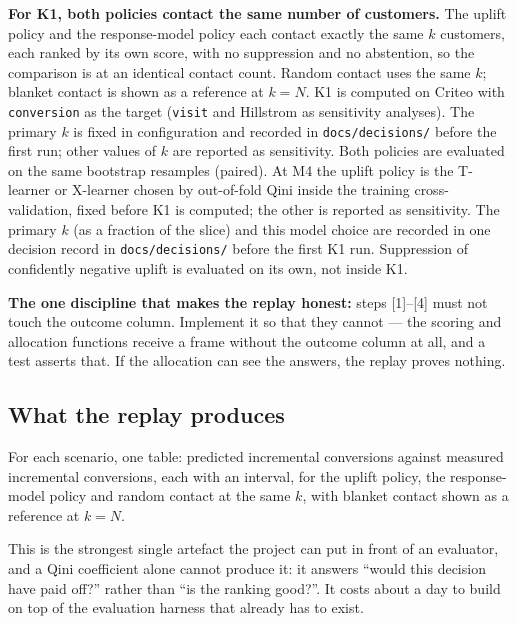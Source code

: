 \documentclass[11pt,a4paper]{article}
\begin{document}
\textbf{For K1, both policies contact the same number of customers.} The uplift policy and the
response-model policy each contact exactly the same $k$ customers, each ranked by its own score,
with no suppression and no abstention, so the comparison is at an identical contact count. Random
contact uses the same $k$; blanket contact is shown as a reference at $k = N$. K1 is computed on Criteo with \texttt{conversion} as the target (\texttt{visit} and Hillstrom as sensitivity analyses). The primary $k$ is fixed in configuration and recorded in \texttt{docs/decisions/} before the first run; other values of $k$ are reported as sensitivity. Both policies are evaluated on the same bootstrap resamples (paired). At M4 the uplift policy is the T-learner or X-learner chosen by out-of-fold Qini inside the training cross-validation, fixed before K1 is computed; the other is reported as sensitivity. The primary $k$ (as a fraction of the slice) and this model choice are recorded in one decision record in \texttt{docs/decisions/} before the first K1 run. Suppression of
confidently negative uplift is evaluated on its own, not inside K1.

\begin{keybox}
\textbf{The one discipline that makes the replay honest:} steps [1]--[4] must not touch the outcome
column. Implement it so that they cannot --- the scoring and allocation functions receive a frame
without the outcome column at all, and a test asserts that. If the allocation can see the answers,
the replay proves nothing.
\end{keybox}

\subsection{What the replay produces}

For each scenario, one table: predicted incremental conversions against measured incremental
conversions, each with an interval, for the uplift policy, the response-model policy and random
contact at the same $k$, with blanket contact shown as a reference at $k = N$.

\begin{goodbox}
This is the strongest single artefact the project can put in front of an evaluator, and a Qini
coefficient alone cannot produce it: it answers ``would this decision have paid off?'' rather than
``is the ranking good?''. It costs about a day to build on top of the evaluation harness that
already has to exist.
\end{goodbox}
\end{document}
